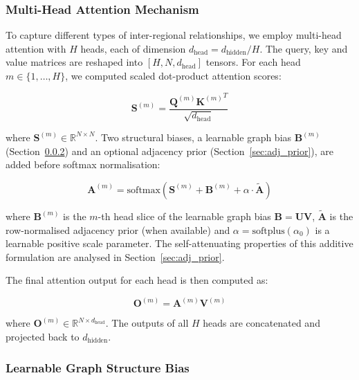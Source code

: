 \documentclass[final,1p,times]{elsarticle}
\begin{document}
\subsubsection{Multi-Head Attention Mechanism}

To capture different types of inter-regional relationships, we employ multi-head attention with $H$ heads, each of dimension $d_{\text{head}} = d_{\text{hidden}} / H$. The query, key and value matrices are reshaped into $[H, N, d_{\text{head}}]$ tensors. For each head $m \in \{1, \ldots, H\}$, we computed scaled dot-product attention scores:

\begin{equation}
\mathbf{S}^{(m)} = \frac{\mathbf{Q}^{(m)} {\mathbf{K}^{(m)}}^T}{\sqrt{d_{\text{head}}}}
\end{equation}

where $\mathbf{S}^{(m)} \in \mathbb{R}^{N \times N}$. Two structural biases, a learnable graph bias $\mathbf{B}^{(m)}$ (Section~\ref{sec:graph_bias}) and an optional adjacency prior (Section~\ref{sec:adj_prior}), are added before softmax normalisation:

\begin{equation}
\mathbf{A}^{(m)} = \text{softmax}(\mathbf{S}^{(m)} + \mathbf{B}^{(m)} + \alpha \cdot \tilde{\mathbf{A}})
\end{equation}

where $\mathbf{B}^{(m)}$ is the $m$-th head slice of the learnable graph bias $\mathbf{B} = \mathbf{UV}$, $\tilde{\mathbf{A}}$ is the row-normalised adjacency prior (when available) and $\alpha = \text{softplus}(\alpha_0)$ is a learnable positive scale parameter. The self-attenuating properties of this additive formulation are analysed in Section~\ref{sec:adj_prior}.

The final attention output for each head is then computed as:

\begin{equation}
\mathbf{O}^{(m)} = \mathbf{A}^{(m)} \mathbf{V}^{(m)}
\end{equation}

where $\mathbf{O}^{(m)} \in \mathbb{R}^{N \times d_{\text{head}}}$. The outputs of all $H$ heads are concatenated and projected back to $d_{\text{hidden}}$.

\subsubsection{Learnable Graph Structure Bias}
\label{sec:graph_bias}
\end{document}
